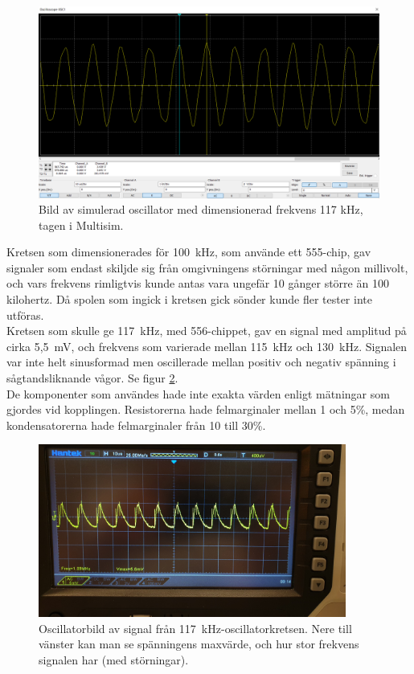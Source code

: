 \documentclass[a4paper]{article}
\begin{document}
\begin{sloppypar}
  \begin{figure}[H]
    \centering
    \includegraphics[width=\textwidth]{multisim-signal-555-117kHz.png}
    \caption{Bild av simulerad oscillator med dimensionerad frekvens 117 kHz, tagen i Multisim.}
    \label{fig:sim-117kHz}
  \end{figure}
  \noindent
  Kretsen som dimensionerades för 100~kHz, som använde ett 555-chip, gav signaler som endast skiljde sig från omgivningens störningar med någon millivolt, och vars frekvens rimligtvis kunde antas vara ungefär 10 gånger större än 100 kilohertz.
  Då spolen som ingick i kretsen gick sönder kunde fler tester inte utföras.
  \\
  Kretsen som skulle ge 117~kHz, med 556-chippet, gav en signal med amplitud på cirka 5,5~mV, och frekvens som varierade mellan 115~kHz och 130~kHz.
  Signalen var inte helt sinusformad men oscillerade mellan positiv och negativ spänning i sågtandsliknande vågor. Se figur \ref{fig:signal-117kHz}.
  \\
  De komponenter som användes hade inte exakta värden enligt mätningar som gjordes vid kopplingen. Resistorerna hade felmarginaler mellan 1 och 5\%, medan kondensatorerna hade felmarginaler från 10 till 30\%.

  \begin{figure}[H]
    \centering
    \includegraphics[width = 0.9\textwidth]{signal-555-117kHz.jpg}
    \caption{Oscillatorbild av signal från 117~kHz-oscillatorkretsen. Nere till vänster kan man se spänningens maxvärde, och hur stor frekvens signalen har (med störningar).}
    \label{fig:signal-117kHz}
  \end{figure}


\end{sloppypar}
\end{document}
